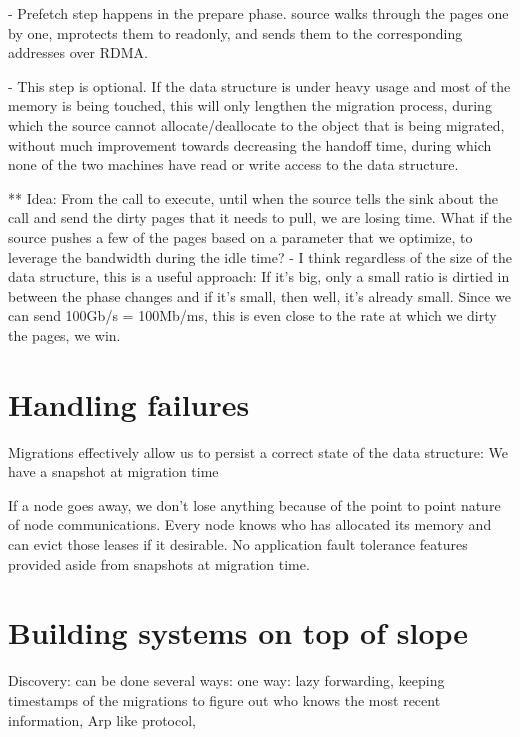 - Prefetch step happens in the prepare phase. source walks through the pages one by one, mprotects them to readonly, and
  sends them to the corresponding addresses over RDMA.

  - This step is optional. If the data structure is under heavy usage and most of the memory is being touched, this
  will only lengthen the migration process, during which the source cannot allocate/deallocate to the object that is being
  migrated, without much improvement towards decreasing the handoff time, during which
  none of the two machines have read or write access to the data structure.


** Idea: From the call to execute, until when the source tells the sink about the call and send the
dirty pages that it needs to pull, we are losing time. What if the source pushes a few of the pages
based on a parameter that we optimize, to leverage the bandwidth during the idle time?
 - I think regardless of the size of the data structure, this is a useful approach: If it's big,
 only a small ratio is dirtied in between the phase changes and if it's small, then well, it's already small.
 Since we can send 100Gb/s = 100Mb/ms, this is even close to the rate at which we dirty the pages, we win.  

\section{Handling failures}
Migrations effectively allow us to persist a correct state of the data structure: We have a snapshot at migration time

If a node goes away, we don't lose anything because of the point to point
nature of node communications. Every node knows who has allocated its memory
and can evict those leases if it desirable. No application fault tolerance
features provided aside from snapshots at migration time.


\section{Building systems on top of slope}
Discovery: can be done several ways: one way: lazy forwarding, keeping timestamps
of the migrations to figure out who knows the most recent information, 
Arp like protocol, 
